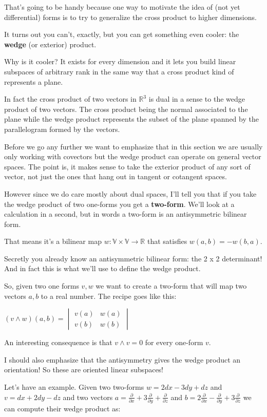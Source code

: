 \documentclass{article}
\begin{document}
That's going to be handy because one way to motivate the idea of (not yet
differential) forms is to try to generalize the cross product to higher
dimensions.

It turns out you can't, exactly, but you can get something even cooler: the
\textbf{wedge} (or exterior) product.

Why is it cooler? It exists for every dimension and it lets you build linear
subspaces of arbitrary rank in the same way that a cross product kind of
represents a plane.

In fact the cross product of two vectors in $\mathbb{R}^{3}$
is dual in a sense to the wedge product of two vectors. The cross product being
the normal associated to the plane while the wedge product represents the subset
of the plane spanned by the parallelogram formed by the vectors.

Before we go any further we want to emphasize that in this section we are
usually only working with covectors but the wedge product can operate on general
vector spaces. The point is, it makes sense to take the exterior product of any sort of vector, not just the
ones that hang out in tangent or cotangent spaces.

However since we do care mostly about dual spaces, I'll tell you that if you take
the wedge product of two one-forms you get a \textbf{two-form}. We'll look at a
calculation in a second, but in words a two-form is an antisymmetric bilinear
form.

That means it's a bilinear map $w: \mathbb{V} \times \mathbb{V} \to \mathbb{R}$
that satisfies $w(a, b) = -w(b, a)$.

Secretly you already know an antisymmetric bilinear form: the 2 x 2 determinant!
And in fact this is what we'll use to define the wedge product.

So, given two one forms $v, w$ we want to create a two-form that will map two
vectors $a, b$ to a real number. The recipe goes like this:

$
(v \wedge w) (a, b) =
\begin{vmatrix}
  v (a) & w (a) \\
  v (b) & w (b)
\end{vmatrix}
$

An interesting consequence is that $v \wedge v = 0$ for every one-form $v$.

I should also emphasize that the antisymmetry gives the wedge product an
orientation! So these are oriented linear subspaces!

Let's have an example. Given two two-forms $w = 2dx - 3dy + dz$ and $v = dx +
2dy - dz$ and two vectors $a = \frac{\partial}{\partial x} +
3\frac{\partial}{\partial y} + \frac{\partial}{\partial z}$ and $b =
2\frac{\partial}{\partial x} - \frac{\partial}{\partial y} +
3\frac{\partial}{\partial z}$ we can compute their wedge product as:
\end{document}

